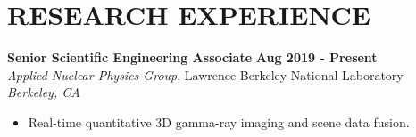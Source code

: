 \section{\small{RESEARCH EXPERIENCE}}

\textbf{Senior Scientific Engineering Associate} \hfill \textbf{Aug 2019 - Present} \\
\textsl{Applied Nuclear Physics Group}, Lawrence Berkeley National Laboratory \hfill \textsl{Berkeley, CA} \\[-2.8ex]
\vspace{2pt}
\begin{itemize}[leftmargin=4ex] \itemsep -2pt
    \item Real-time quantitative 3D gamma-ray imaging and scene data fusion.
\end{itemize}

